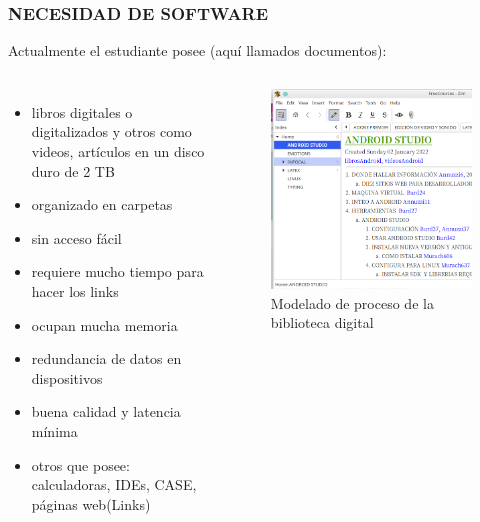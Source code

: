 \documentclass[article]{beamer}
\begin{document}

\begin{frame}[fragile]
\frametitle{NECESIDAD DE SOFTWARE}
Actualmente el estudiante posee (aquí llamados documentos):
\begin{columns}
\begin{itemize}
\item libros digitales o digitalizados y otros como videos, artículos en un disco duro de 2 TB
\item organizado en carpetas
\item sin acceso fácil 
\item requiere mucho tiempo para hacer los links
\item ocupan mucha memoria
\item redundancia de datos en dispositivos
\item buena calidad y latencia mínima
\item otros que posee: calculadoras, IDEs, CASE, páginas web(Links)
\end{itemize}
\begin{figure}[ht]
	\centering
	\includegraphics[scale=0.4]{images/zim}
	\caption{Modelado de proceso de la biblioteca digital}
\end{figure}
\end{columns}
\end{frame}
\end{document}
